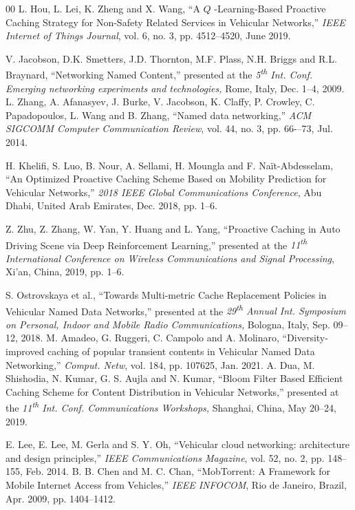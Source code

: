 \documentclass{ieeeaccess}
\begin{document}
\begin{thebibliography}{00}
 L. Hou, L. Lei, K. Zheng and X. Wang, ``A  $Q$ -Learning-Based Proactive Caching Strategy for Non-Safety Related Services in Vehicular Networks,'' \emph{IEEE Internet of Things Journal}, vol. 6, no. 3, pp. 4512--4520, June 2019.

 V. Jacobson, D.K. Smetters, J.D. Thornton, M.F. Plass, N.H. Briggs and R.L. Braynard,  ``Networking Named Content,'' presented at the \emph{5\textsuperscript{th} Int. Conf. Emerging networking experiments and technologies,} Rome, Italy, Dec. 1--4, 2009.
 L. Zhang, A. Afanasyev, J. Burke, V. Jacobson, K. Claffy, P. Crowley, C. Papadopoulos, L. Wang and B. Zhang, ``Named data networking,'' \emph{ACM SIGCOMM Computer Communication Review}, vol. 44, no. 3, pp. 66-–73, Jul. 2014.


 H. Khelifi, S. Luo, B. Nour, A. Sellami, H. Moungla and F. Naït-Abdesselam, ``An Optimized Proactive Caching Scheme Based on Mobility Prediction for Vehicular Networks,'' \emph{2018 IEEE Global Communications Conference}, Abu Dhabi, United Arab Emirates, Dec. 2018, pp. 1--6.

 Z. Zhu, Z. Zhang, W. Yan, Y. Huang and L. Yang, ``Proactive Caching in Auto Driving Scene via Deep Reinforcement Learning,'' presented at the \emph{11\textsuperscript{th} International Conference on Wireless Communications and Signal Processing}, Xi'an, China, 2019, pp. 1--6.

 S. Ostrovskaya et al.,  ``Towards Multi-metric Cache Replacement Policies in Vehicular Named Data Networks,'' presented at the \emph{29\textsuperscript{th} Annual Int. Symposium on Personal, Indoor and Mobile Radio Communications,} Bologna, Italy, Sep. 09--12, 2018.
 M. Amadeo, G. Ruggeri, C. Campolo and A. Molinaro,  ``Diversity-improved caching of popular transient contents in Vehicular Named Data Networking,'' \emph{Comput. Netw}, vol. 184, pp. 107625, Jan. 2021.
 A. Dua, M. Shishodia, N. Kumar, G. S. Aujla and N. Kumar,  ``Bloom Filter Based Efficient Caching Scheme for Content Distribution in Vehicular Networks,'' presented at the \emph{11\textsuperscript{th} Int. Conf. Communications Workshops,} Shanghai, China, May 20--24, 2019.

 E. Lee, E. Lee, M. Gerla and S. Y. Oh,  ``Vehicular cloud networking: architecture and design principles,'' \emph{IEEE Communications Magazine}, vol. 52, no. 2, pp. 148--155, Feb. 2014.
 B. B. Chen and M. C. Chan,  ``MobTorrent: A Framework for Mobile Internet Access from Vehicles,'' \emph{IEEE INFOCOM}, Rio de Janeiro, Brazil, Apr. 2009, pp. 1404--1412.


\end{thebibliography}
\end{document}
